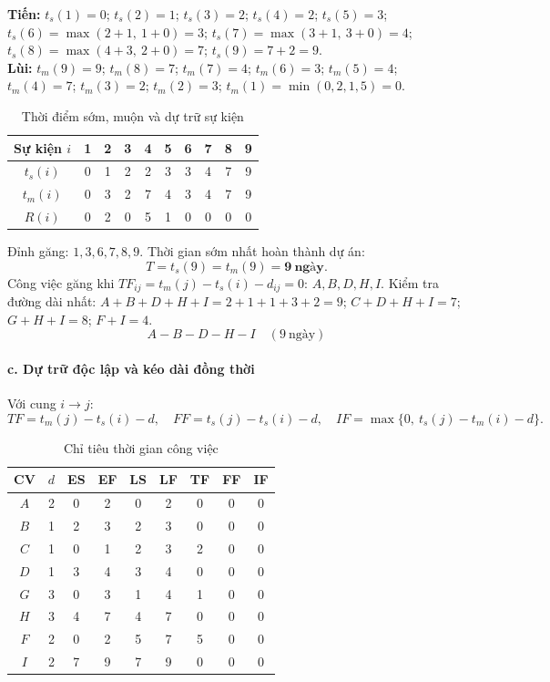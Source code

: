 \documentclass[11pt,a4paper]{article}
\begin{document}
{\small
\textbf{Tiến:}
$t_s(1)=0$;
$t_s(2)=1$;
$t_s(3)=2$;
$t_s(4)=2$;
$t_s(5)=3$;
$t_s(6)=\max(2+1,\ 1+0)=3$;
$t_s(7)=\max(3+1,\ 3+0)=4$;
$t_s(8)=\max(4+3,\ 2+0)=7$;
$t_s(9)=7+2=9$.
\\
\textbf{Lùi:}
$t_m(9)=9$;
$t_m(8)=7$;
$t_m(7)=4$;
$t_m(6)=3$;
$t_m(5)=4$;
$t_m(4)=7$;
$t_m(3)=2$;
$t_m(2)=3$;
$t_m(1)=\min(0,2,1,5)=0$.
}

\begin{table}[H]\centering
\caption{Thời điểm sớm, muộn và dự trữ sự kiện}
\small
\begin{tabular}{c|ccccccccc}
\toprule
Sự kiện $i$ & 1 & 2 & 3 & 4 & 5 & 6 & 7 & 8 & 9\\
\midrule
$t_s(i)$ & 0 & 1 & 2 & 2 & 3 & 3 & 4 & 7 & 9\\
$t_m(i)$ & 0 & 3 & 2 & 7 & 4 & 3 & 4 & 7 & 9\\
$R(i)$   & 0 & 2 & 0 & 5 & 1 & 0 & 0 & 0 & 0\\
\bottomrule
\end{tabular}
\end{table}

Đỉnh găng: $1,3,6,7,8,9$. Thời gian sớm nhất hoàn thành dự án:
\[
  T = t_s(9) = t_m(9) = \mathbf{9\ \text{ngày}}.
\]
Công việc găng khi $TF_{ij}=t_m(j)-t_s(i)-d_{ij}=0$: $A,B,D,H,I$.
Kiểm tra đường dài nhất: $A{+}B{+}D{+}H{+}I=2{+}1{+}1{+}3{+}2=9$;
$C{+}D{+}H{+}I=7$; $G{+}H{+}I=8$; $F{+}I=4$.
\[
  \boxed{A-B-D-H-I \quad (9\ \text{ngày})}
\]

\paragraph{c. Dự trữ độc lập và kéo dài đồng thời}
Với cung $i\rightarrow j$:
\[
  TF=t_m(j)-t_s(i)-d,\quad
  FF=t_s(j)-t_s(i)-d,\quad
  IF=\max\{0,\ t_s(j)-t_m(i)-d\}.
\]

\begin{table}[H]\centering
\caption{Chỉ tiêu thời gian công việc}
\small
\begin{tabular}{c|c|cc|cc|ccc}
\toprule
CV & $d$ & ES & EF & LS & LF & TF & FF & IF\\
\midrule
$A$ & 2 & 0 & 2 & 0 & 2 & 0 & 0 & 0\\
$B$ & 1 & 2 & 3 & 2 & 3 & 0 & 0 & 0\\
$C$ & 1 & 0 & 1 & 2 & 3 & 2 & 0 & 0\\
$D$ & 1 & 3 & 4 & 3 & 4 & 0 & 0 & 0\\
$G$ & 3 & 0 & 3 & 1 & 4 & 1 & 0 & 0\\
$H$ & 3 & 4 & 7 & 4 & 7 & 0 & 0 & 0\\
$F$ & 2 & 0 & 2 & 5 & 7 & 5 & 0 & 0\\
$I$ & 2 & 7 & 9 & 7 & 9 & 0 & 0 & 0\\
\bottomrule
\end{tabular}
\end{table}
\end{document}
